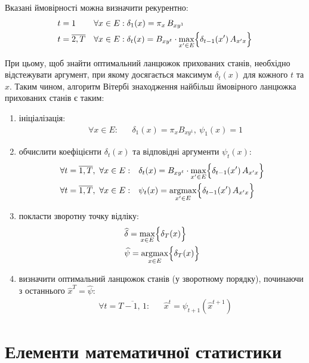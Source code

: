 Вказані ймовірності можна визначити рекурентно:
\begin{align*}
    & t = 1              && \forall x \in E: \delta_1(x)=\pi_{x}\,B_{xy^1} \\
    & t = \overline{2,T} && \forall x \in E: \delta_{t}(x)=B_{xy^{t}}\cdot\max_{x' \in E}\Bigl\{ \delta_{t-1}(x')\,A_{x'x} \Bigr\}
\end{align*}

При цьому, щоб знайти оптимальний ланцюжок прихованих станів, необхідно відстежувати аргумент, при якому досягається максимум $\delta_t(x)$ для кожного $t$ та $x$. Таким чином, алгоритм Вітербі знаходження найбільш ймовірного ланцюжка прихованих станів є таким:

\begin{enumerate}
    \item ініціалізація:
    \begin{align*}
        &\forall x \in E: && \delta_1(x)=\pi_{x}B_{xy^1}, \ \psi_1(x)=1
    \end{align*}    
    \item обчислити коефіцієнти $\delta_t(x)$ та відповідні аргументи $\psi_t(x):$
    \begin{align*}
        &\forall t=\overline{1,T}, \ \forall x \in E: && \delta_{t}(x)=B_{xy^{t}}\cdot\max_{x'\in E}\Bigl\{\delta_{t-1}(x')\,A_{x'x}\Bigr\} \\
        &\forall t=\overline{1,T}, \ \forall x \in E: && \psi_{t}(x)=\operatorname*{argmax}_{x'\in E}\Bigl\{\delta_{t-1}(x')\,A_{x'x}\Bigr\}
    \end{align*}
    \item покласти зворотну точку відліку:
    \begin{align*}
        &\widehat{\delta}=\max_{x \in E}\Bigl\{\delta_T(x)\Bigr\} \\
        &\widehat{\psi}=\operatorname*{argmax}_{x \in E}\Bigl\{\delta_T(x)\Bigr\}
    \end{align*}
    \item визначити оптимальний ланцюжок станів (у зворотному порядку), починаючи з останнього $\widehat{x}^T=\widehat{\psi}:$
    \begin{align*}
        &\forall t=\overline{T-1,\,1}: && \widehat{x}^t=\psi_{t+1}(\widehat{x}^{t+1})
    \end{align*}
\end{enumerate}

\section{Елементи математичної статистики}

